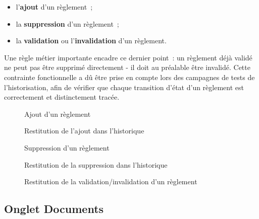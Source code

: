 \begin{itemize}
  \item l'\textbf{ajout} d'un règlement~;
  \item la \textbf{suppression} d'un règlement~;
  \item la \textbf{validation} ou l'\textbf{invalidation} d'un
        règlement.
\end{itemize}

Une règle métier importante encadre ce dernier point~: un règlement déjà
validé ne peut pas être supprimé directement  -  il doit au préalable être
invalidé. Cette contrainte fonctionnelle a dû être prise en compte lors
des campagnes de tests de l'historisation, afin de vérifier que chaque
transition d'état d'un règlement est correctement et distinctement
tracée.

\begin{figure}[H]
  \centering
  \caption{Ajout d'un règlement}
  \label{fig:ajout-reglement}
\end{figure}

\begin{figure}[H]
  \centering
  \caption{Restitution de l'ajout dans l'historique}
  \label{fig:ajout-reglement-hist}
\end{figure}

\begin{figure}[H]
  \centering
  \caption{Suppression d'un règlement}
  \label{fig:suppr-reglement}
\end{figure}

\begin{figure}[H]
  \centering
  \caption{Restitution de la suppression dans l'historique}
  \label{fig:suppr-reglement-hist}
\end{figure}

\begin{figure}[H]
  \centering
  \caption{Restitution de la validation/invalidation d'un règlement}
  \label{fig:valid-reglement-hist}
\end{figure}

\subsection{Onglet Documents}

